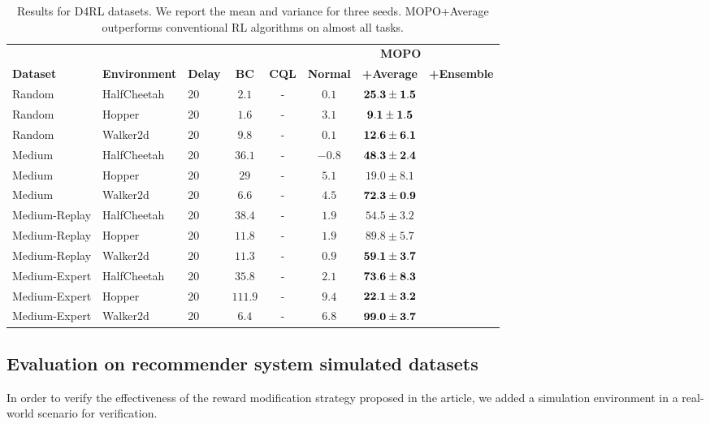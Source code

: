 \begin{table}[h]
\centering
\begin{tabular}{lll|cc|ccc}
\toprule
& & & & & \multicolumn{3}{c}{\bf MOPO} \\
\multicolumn{1}{l}{\bf Dataset} & \multicolumn{1}{c}{\bf Environment} & \multicolumn{1}{c|}{\bf Delay} & \multicolumn{1}{c}{\bf BC} & \multicolumn{1}{c|}{\bf CQL} & \multicolumn{1}{c}{\bf{Normal}} & \multicolumn{1}{c}{\bf +Average} & \multicolumn{1}{c}{\bf +Ensemble}\\
\midrule
Random        & HalfCheetah &  20 & $2.1$ &  -  &  $0.1$ &  $\bf{25.3 \pm 1.5 }$ \\
Random        & Hopper      &  20 & $1.6$ &  -  &  $3.1$ &  $\bf{9.1 \pm 1.5 }$ \\
Random        & Walker2d    &  20 & $9.8$ &  -  &  $0.1$ &  $\bf{12.6 \pm 6.1 }$ \\
\midrule
Medium        & HalfCheetah &  20 & $36.1$ &  - &  $-0.8$ &  $\bf{48.3 \pm 2.4}$ \\
Medium        & Hopper      &  20 & $29$ & - & $5.1$ &  $19.0 \pm 8.1$ \\
Medium        & Walker2d    &  20 & $6.6$ & - & $4.5$ &  $\bf{72.3 \pm 0.9}$ \\
\midrule
Medium-Replay & HalfCheetah &  20 & $38.4$ & - & $1.9$ &  $54.5 \pm 3.2$ \\
Medium-Replay & Hopper      &  20 & $11.8$ & - & $1.9$ &  $89.8 \pm 5.7$ \\
Medium-Replay & Walker2d    &  20 & $11.3$ & - & $0.9$ &  $\bf{59.1 \pm 3.7}$ \\
\midrule
Medium-Expert & HalfCheetah &  20 & $35.8$ & - & $2.1$ &  $\bf{73.6 \pm 8.3}$ \\
Medium-Expert & Hopper      &  20 & $111.9$ & - & $9.4$ &  $\bf{22.1 \pm 3.2}$ \\
Medium-Expert & Walker2d    &  20 & $6.4$  & - & $6.8$ & $\bf{99.0 \pm 3.7}$\\
\bottomrule
\end{tabular}
\caption{
Results for D4RL datasets\protect\footnotemark.
We report the mean and variance for three seeds.
MOPO+Average outperforms conventional RL algorithms on almost all tasks.}
\label{tbl:mujoco_results}
\end{table}

\subsection{Evaluation on recommender system simulated datasets}
In order to verify the effectiveness of the reward modification strategy proposed in the article, we added a simulation environment in a real-world scenario for verification.



